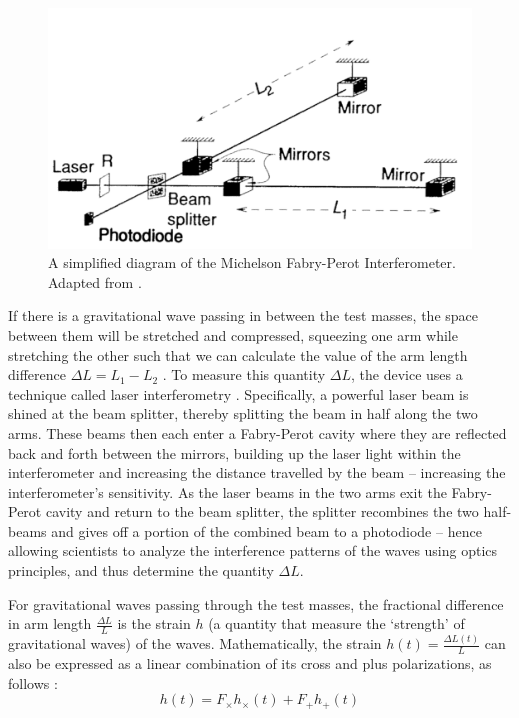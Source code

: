 \documentclass[preprint,
letterpaper,
 amsmath,amssymb,
 aps,
]{revtex4-2}
\begin{document}
\begin{figure}
\includegraphics[scale = .4]{Interferometer.png}
\caption{A simplified diagram of the Michelson Fabry-Perot Interferometer. Adapted from \cite{JSTORLIGO}.}
\centering
\end{figure} 
If there is a gravitational wave passing in between the test masses, the space between them will be stretched and compressed, squeezing one arm while stretching the other such that we can calculate the value of the arm length difference $\Delta L = L_1 - L_2$ \cite{teacherintro}. To measure this quantity $\Delta L$, the device uses a technique called laser interferometry \cite{LIGOArxiv}. Specifically, a powerful laser beam is shined at the beam splitter, thereby splitting the beam in half along the two arms. These beams then each enter a Fabry-Perot cavity where they are reflected back and forth between the mirrors, building up the laser light within the interferometer and increasing the distance travelled by the beam \cite{fabry} – increasing the interferometer's sensitivity. As the laser beams in the two arms exit the Fabry-Perot cavity and return to the beam splitter, the splitter recombines the two half-beams and gives off a portion of the combined beam to a photodiode – hence allowing scientists to analyze the interference patterns of the waves using optics principles, and thus determine the quantity $\Delta L$. 

For gravitational waves passing through the test masses, the fractional difference in arm length $\frac{\Delta L}{L}$ is the strain $h$ (a quantity that measure the `strength' of gravitational waves) of the waves. Mathematically, the strain $h(t) = \frac{\Delta L(t)}{L}$ can also be expressed as a linear combination of its cross and plus polarizations, as follows \cite{JSTORLIGO}:
\begin{equation}
h(t) = F_\times h_\times (t) + F_+ h_+ (t)
\end{equation}
\end{document}
